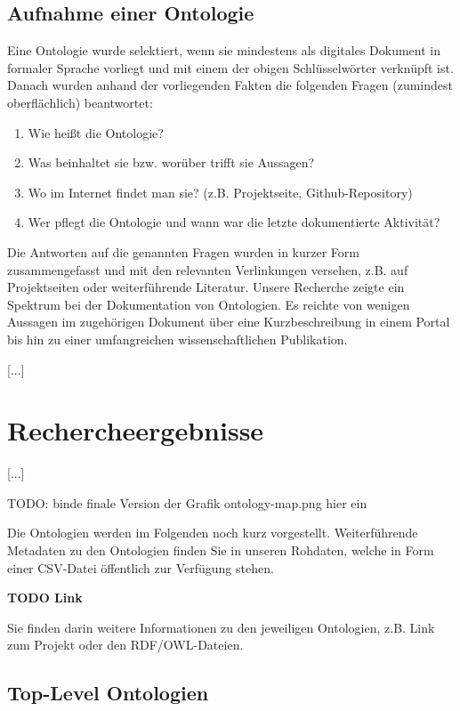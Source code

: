 \documentclass{article}
\begin{document}
\subsection{Aufnahme einer Ontologie}

Eine Ontologie wurde selektiert, wenn sie mindestens als digitales Dokument in formaler Sprache vorliegt und mit einem der obigen Schlüsselwörter verknüpft ist.
Danach wurden anhand der vorliegenden Fakten die folgenden Fragen (zumindest oberflächlich) beantwortet:

\begin{enumerate}
    \item Wie heißt die Ontologie?
    \item Was beinhaltet sie bzw. worüber trifft sie Aussagen?
    \item Wo im Internet findet man sie? (z.B. Projektseite, Github-Repository)
    \item Wer pflegt die Ontologie und wann war die letzte dokumentierte Aktivität?
\end{enumerate}

Die Antworten auf die genannten Fragen wurden in kurzer Form zusammengefasst und mit den relevanten Verlinkungen versehen, z.B. auf Projektseiten oder weiterführende Literatur.
Unsere Recherche zeigte ein Spektrum bei der Dokumentation von Ontologien.
Es reichte von wenigen Aussagen im zugehörigen Dokument über eine Kurzbeschreibung in einem Portal bis hin zu einer umfangreichen wissenschaftlichen Publikation.

[...]


\section{Rechercheergebnisse}

[...]

TODO: binde finale Version der Grafik ontology-map.png hier ein

Die Ontologien werden im Folgenden noch kurz vorgestellt.
Weiterführende Metadaten zu den Ontologien finden Sie in unseren Rohdaten, welche in Form einer CSV-Datei öffentlich zur Verfügung stehen.

\textbf{TODO Link}

Sie finden darin weitere Informationen zu den jeweiligen Ontologien, z.B. Link zum Projekt oder den RDF/OWL-Dateien.

\subsection{Top-Level Ontologien}
\end{document}
